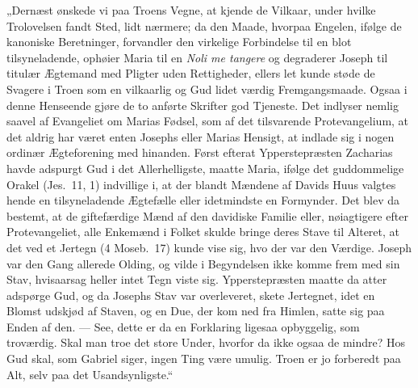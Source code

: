 \documentclass[12pt,a4paper]{book}
\begin{document}
„Dernæst ønskede vi paa Troens Vegne, at kjende de Vilkaar, under hvilke
Trolovelsen fandt Sted, lidt nærmere; da den Maade, hvorpaa Engelen, ifølge
de kanoniske Beretninger, forvandler den virkelige Forbindelse til en blot
tilsyneladende, ophøier Maria til en \textit{Noli me tangere} og degraderer
Joseph til titulær Ægtemand med Pligter uden Rettigheder, ellers let kunde
støde de Svagere i Troen som en vilkaarlig og Gud lidet værdig
Fremgangsmaade. Ogsaa i denne Henseende gjøre de to anførte Skrifter god
Tjeneste. Det indlyser nemlig saavel af Evangeliet om Marias Fødsel, som af
det tilsvarende Protevangelium, at det aldrig har været enten Josephs eller
Marias Hensigt, at indlade sig i nogen ordinær Ægteforening med hinanden.
Først efterat Ypperstepræsten Zacharias havde adspurgt Gud i det
Allerhelligste, maatte Maria, ifølge det guddommelige Orakel (Jes.\ 11, 1)
indvillige i, at der blandt Mændene af Davids Huus valgtes hende en
tilsyneladende Ægtefælle eller idetmindste en Formynder. Det blev da bestemt,
at de giftefærdige Mænd af den davidiske Familie eller, nøiagtigere efter
Protevangeliet, alle Enkemænd i Folket skulde bringe deres Stave til Alteret,
at det ved et Jertegn (4 Moseb.\ 17) kunde vise sig, hvo der var den Værdige.
Joseph var den Gang allerede Olding, og vilde i Begyndelsen ikke komme
frem med sin Stav, hvisaarsag heller intet Tegn viste sig. Ypperstepræsten
maatte da atter adspørge Gud, og da Josephs Stav var overleveret, skete
Jertegnet, idet en Blomst udskjød af Staven, og en Due, der kom ned fra
Himlen, satte sig paa Enden af den. --- See, dette er da en Forklaring
ligesaa opbyggelig, som troværdig. Skal man troe det store Under, hvorfor da
ikke ogsaa de mindre? Hos Gud skal, som Gabriel siger, ingen Ting være
umulig. Troen er jo forberedt paa Alt, selv paa det Usandsynligste.“
\end{document}
